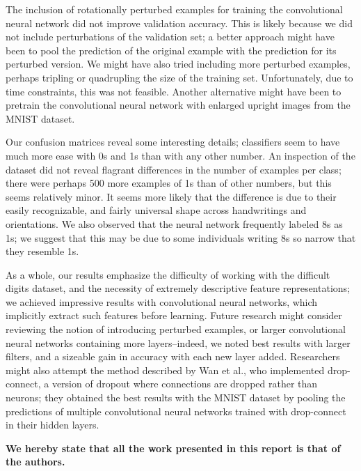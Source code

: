 \documentclass{acm_proc_article-sp}
\begin{document}
The inclusion of rotationally perturbed examples for training the convolutional neural network did not improve validation accuracy. This is likely because we did not include perturbations of the validation set; a better approach might have been to pool the prediction of the original example with the prediction for its perturbed version. We might have also tried including more perturbed examples, perhaps tripling or quadrupling the size of the training set. Unfortunately, due to time constraints, this was not feasible. Another alternative might have been to pretrain the convolutional neural network with enlarged upright images from the MNIST dataset.\cite{Erhan}\cite{Rowley}

Our confusion matrices reveal some interesting details; classifiers seem to have much more ease with 0s and 1s than with any other number. An inspection of the dataset did not reveal flagrant differences in the number of examples per class; there were perhaps 500 more examples of 1s than of other numbers, but this seems relatively minor. It seems more likely that the difference is due to their easily recognizable, and fairly universal shape across handwritings and orientations. We also observed that the neural network frequently labeled 8s as 1s; we suggest that this may be due to some individuals writing 8s so narrow that they resemble 1s.

As a whole, our results emphasize the difficulty of working with the difficult digits dataset, and the necessity of extremely descriptive feature representations; we achieved impressive results with convolutional neural networks, which implicitly extract such features before learning. Future research might consider reviewing the notion of introducing perturbed examples, or larger convolutional neural networks containing more layers--indeed, we noted best results with larger filters, and a sizeable gain in accuracy with each new layer added. Researchers might also attempt the method described by Wan et al.\cite{Wan}, who implemented drop-connect, a version of dropout where connections are dropped rather than neurons; they obtained the best results with the MNIST dataset by pooling the predictions of multiple convolutional neural networks trained with drop-connect in their hidden layers.

{\bfseries We hereby state that all the work presented in this report is that of the authors.}




\newpage
\appendix
\label{appendix}
\end{document}
